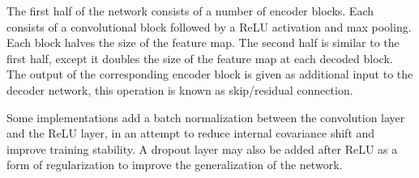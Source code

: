 The first half of the network consists of a number of encoder blocks. Each consists of a convolutional block followed by a ReLU activation and max pooling. Each block halves the size of the feature map. The second half is similar to the first half, except it doubles the size of the feature map at each decoded block. The output of the corresponding encoder block is given as additional input to the decoder network, this operation is known as skip/residual connection.

Some implementations add a batch normalization between the convolution layer and the ReLU layer, in an attempt to reduce internal covariance shift and improve training stability. A dropout layer may also be added after ReLU as a form of regularization to improve the generalization of the network.
